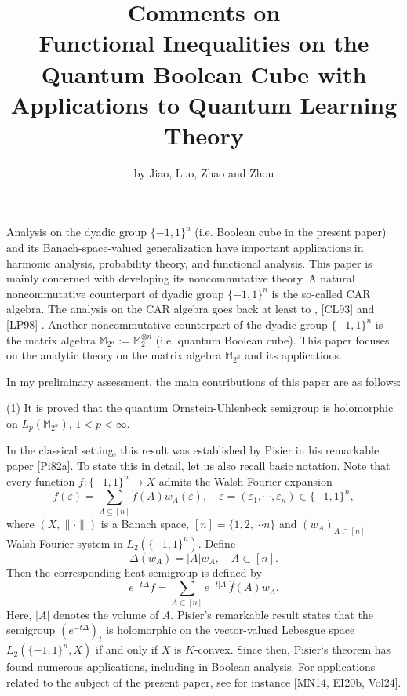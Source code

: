 \documentclass[a4paper, 11pt]{article}
\title
{{\bf Comments on}\\
	Functional Inequalities on the Quantum Boolean Cube with Applications to Quantum Learning Theory}
\author{by Jiao, Luo, Zhao and Zhou}
\begin{document}
\maketitle


Analysis on the dyadic group $\{-1,1\}^n$ (i.e. Boolean cube in the present paper)   and its Banach-space-valued generalization have important applications in harmonic analysis, probability theory, and functional analysis. This paper is mainly concerned with developing its noncommutative theory. A natural noncommutative counterpart of  dyadic group $\{-1,1\}^n$ is the so-called CAR algebra. The analysis on the CAR algebra goes back at least to \cite{AFS1996}, [CL93] and [LP98] .  Another noncommutative counterpart of the  dyadic group $\{-1,1\}^n$ is the matrix algebra $\mathbb{M}_{2^{n}}:=\mathbb{M}_2^{\otimes n}$ (i.e. quantum Boolean cube). This paper focuses on the analytic theory on the  matrix algebra  $\mathbb{M}_{2^{n}}$ and its applications.

\medskip

In my preliminary assessment, the main contributions of this paper are as follows:

\medskip

(1) It is proved that the quantum Ornstein-Uhlenbeck semigroup is holomorphic on $L_p(\mathbb{M}_{2^{n}})$, $1<p<\infty$. 

In the classical setting, this result was established by Pisier in his remarkable paper [Pi82a]. To state this in detail, let us also recall basic notation.  Note that every function $f:\{-1,1\}^n\to X$ admits the Walsh-Fourier expansion
\begin{equation}\label{WF e}
	f(\varepsilon)=\sum_{A\subseteq [n]}\widehat{f}(A)w_A(\varepsilon), \quad \varepsilon=(\varepsilon_1,\cdots,\varepsilon_n)\in \{-1,1\}^{n},
\end{equation}
where $(X,\|\cdot\|)$ is a Banach space, $[n]=\{1,2,\cdots n\}$ and $(w_A)_{A\subset [n]}$ Walsh-Fourier system in $L_2(\{-1,1\}^n)$. 
Define 
$$\Delta(w_A)=|A|w_A, \quad A\subset [n].$$
Then the corresponding heat semigroup is  defined by 
$$e^{-t\Delta}f=\sum_{A\subset [n]} e^{-t|A|}\widehat{f}(A)w_A.$$
Here, $|A|$ denotes the volume of $A$.  Pisier's remarkable result states that the semigroup $(e^{-t\Delta})_t$ is holomorphic on the vector-valued Lebesgue space $L_2(\{-1,1\}^n,X)$ if and only if $X$ is $K$-convex. Since then, Pisier‘s theorem has found numerous applications, including in Boolean analysis. For applications related to the subject of the present paper, see for instance [MN14, EI20b, Vol24]. 
\end{document}
